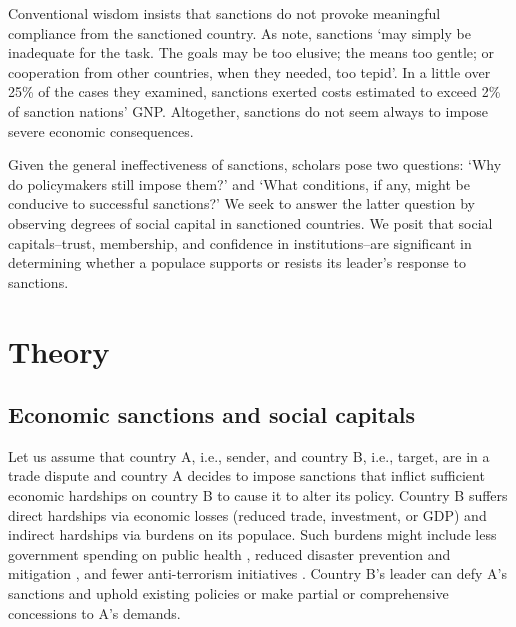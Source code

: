 \documentclass[12pt,]{article}
\begin{document}
Conventional wisdom insists that sanctions do not provoke meaningful
compliance from the sanctioned country. As \citet{hufbauer2007a} note,
sanctions `may simply be inadequate for the task. The goals may be too
elusive; the means too gentle; or cooperation from other countries, when
they needed, too tepid'. In a little over 25\% of the cases they
examined, sanctions exerted costs estimated to exceed 2\% of sanction
nations' GNP. Altogether, sanctions do not seem always to impose severe
economic consequences.

Given the general ineffectiveness of sanctions, scholars pose two
questions: `Why do policymakers still impose them?' and `What
conditions, if any, might be conducive to successful sanctions?' We seek
to answer the latter question by observing degrees of social capital in
sanctioned countries. We posit that social capitals--trust, membership,
and confidence in institutions--are significant in determining whether a
populace supports or resists its leader's response to sanctions.

\hypertarget{theory}{%
\section{Theory}\label{theory}}

\hypertarget{economic-sanctions-and-social-capitals}{%
\subsection{Economic sanctions and social
capitals}\label{economic-sanctions-and-social-capitals}}

Let us assume that country A, i.e., sender, and country B, i.e., target,
are in a trade dispute and country A decides to impose sanctions that
inflict sufficient economic hardships on country B to cause it to alter
its policy. Country B suffers direct hardships via economic losses
(reduced trade, investment, or GDP) and indirect hardships via burdens
on its populace. Such burdens might include less government spending on
public health \citep{marks1999a}, reduced disaster prevention and
mitigation \citep{mclean2019a}, and fewer anti-terrorism initiatives
\citep{navin2016a}. Country B's leader can defy A's sanctions and uphold
existing policies or make partial or comprehensive concessions to A's
demands.
\end{document}
